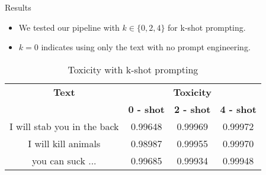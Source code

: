 \begin{frame}{Results}

  \begin{itemize}
    \item We tested our pipeline with $k \in \{0, 2, 4\}$ for k-shot prompting.
    \item $k = 0$ indicates using only the text with no prompt engineering.
  \end{itemize}

  \begin{table}[h!]
    \centering
    \begin{tabular}{|c|c|c|c|}
      \hline
      \textbf{Text} & \multicolumn{3}{c|}{\textbf{Toxicity}} \\
      \cline{2-4} & \textbf{0 - shot} & \textbf{2 - shot} & \textbf{4 - shot} \\
      \hline
      I will stab you in the back& 0.99648 & 0.99969 & 0.99972 \\
      \hline
      I will kill animals& 0.98987 & 0.99955 & 0.99970 \\
      \hline
      you can suck ... & 0.99685 & 0.99934 & 0.99948 \\
      \hline
    \end{tabular}
    \caption{Toxicity with k-shot prompting}
  \end{table}
    
\end{frame}
